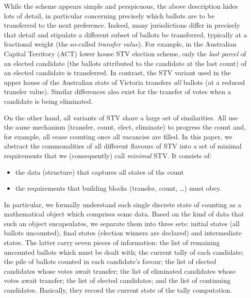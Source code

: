 \documentclass{llncs}
\begin{document}
\noindent
While the scheme appears simple and perspicuous, the above
description hides lots of detail, in particular concerning precisely
which ballots are to be transferred to the next preference.
Indeed, many jurisdictions differ in precisely that detail and
stipulate a different subset of ballots be transferred, typically at
a fractional weight (the so-called \emph{transfer value}). 
For example, in the Australian Capital Territory (ACT) lower house
STV election scheme, only the 
\emph{last parcel} of an elected candidate (the ballots attributed
to the candidate at the last
count)  of an elected candidate is transferred. In
contrast, the STV variant used in the upper house of the
Australian state of Victoria transfers \emph{all} ballots (at a
reduced transfer value). Similar differences also exist for the
transfer of votes when a candidate is being eliminated. 

On the other hand, all variants of STV share a large set of
similarities. All use the same mechanism (transfer, count, elect,
eliminate) to progress the count
and, 
for example, all 
cease counting once all
vacancies are filled. 
%
In this paper, we abstract the commonalities of all different
flavours of STV into a set of minimal requirements that we
(consequently) call 
\emph{minimal} STV. It consists of:
\begin{itemize}
\item the data (structure) that captures all states of the count
\item the requirements that building blocks (transfer, count,
\dots) must obey.
\end{itemize}
\noindent
In particular, we formally understand each single
discrete state of counting as a mathematical object
which comprises some data. Based on the kind of data that such an
object encapsulates, we separate them into three sets: initial
states (all ballots uncounted), final states
(election winners are declared) and intermediate states. The latter
carry seven pieces of information: 
the list of remaining uncounted ballots which must be dealt with;
the current tally of each candidate; 
the pile of ballots counted in each candidate's favour;
the list of elected candidates whose votes await transfer;
the list of eliminated candidates whose votes await transfer;
the list of elected candidates; 
and the list of continuing candidates. 
Basically, they record the current state of the tally computation.
\end{document}
